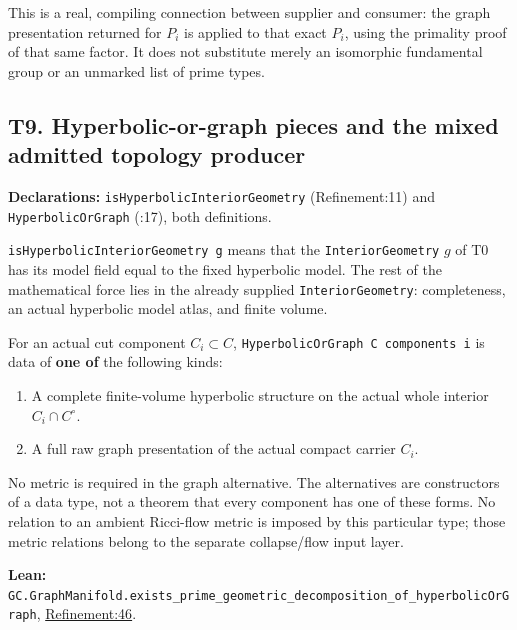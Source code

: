 \documentclass[
  letterpaper,
  11pt]{article}
\providecommand{\tightlist}{%
  \setlength{\itemsep}{0pt}\setlength{\parskip}{0pt}}
\begin{document}
This is a real, compiling connection between supplier and consumer: the
graph presentation returned for \(P_i\) is applied to that exact
\(P_i\), using the primality proof of that same factor. It does not
substitute merely an isomorphic fundamental group or an unmarked list of
prime types.

\subsection{T9. Hyperbolic-or-graph pieces and the mixed admitted
topology producer}\label{t9}

\textbf{Declarations:}
{\small\texttt{is\allowbreak{}Hyperbolic\allowbreak{}Interior\allowbreak{}Geometry}}
(Refinement:11) and
{\small\texttt{Hyperbolic\allowbreak{}Or\allowbreak{}Graph}} (:17), both
definitions.

{\small\texttt{is\allowbreak{}Hyperbolic\allowbreak{}Interior\allowbreak{}Geometry g}}
means that the {\small\texttt{Interior\allowbreak{}Geometry}} \(g\) of
T0 has its model field equal to the fixed hyperbolic model. The rest of
the mathematical force lies in the already supplied
{\small\texttt{Interior\allowbreak{}Geometry}}: completeness, an actual
hyperbolic model atlas, and finite volume.

For an actual cut component \(C_i\subset C\),
{\small\texttt{Hyperbolic\allowbreak{}Or\allowbreak{}Graph C components i}}
is data of \textbf{one of} the following kinds:

\begin{enumerate}
\def\labelenumi{\arabic{enumi}.}
\tightlist
\item
  A complete finite-volume hyperbolic structure on the actual whole
  interior \(C_i\cap C^\circ\).
\item
  A full raw graph presentation of the actual compact carrier \(C_i\).
\end{enumerate}

No metric is required in the graph alternative. The alternatives are
constructors of a data type, not a theorem that every component has one
of these forms. No relation to an ambient Ricci-flow metric is imposed
by this particular type; those metric relations belong to the separate
collapse/flow input layer.

\textbf{Lean:}
{\small\texttt{GC.\allowbreak{}Graph\allowbreak{}Manifold.\allowbreak{}exists\_\allowbreak{}prime\_\allowbreak{}geometric\_\allowbreak{}decomposition\_\allowbreak{}of\_\allowbreak{}hyperbolic\allowbreak{}Or\allowbreak{}Graph}},
\href{https://github.com/qinz1yang/differential-geometry-dev/blob/ea0fae60ee01ef8c8d9b57a51794c6538f679c5d/DifferentialGeometry/Topology/ThreeManifold/GraphManifold/Refinement.lean\#L46}{Refinement:46}.
\end{document}
